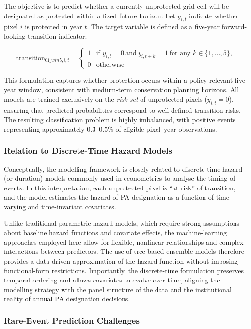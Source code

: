 \documentclass[12pt]{article}
\theoremstyle{break} %
\begin{document}
The objective is to predict whether a currently unprotected grid cell will be designated as protected within a fixed future horizon. Let $y_{i,t}$ indicate whether pixel $i$ is protected in year $t$. The target variable is defined as a five-year forward-looking transition indicator:

\[
\text{transition}_{01\_win5,i,t}
=
\begin{cases}
1 & \text{if } y_{i,t}=0 \ \text{and} \ y_{i,t+k}=1 \ \text{for any } k \in \{1,\dots,5\}, \\
0 & \text{otherwise}.
\end{cases}
\]

This formulation captures whether protection occurs within a policy-relevant
five-year window, consistent with medium-term conservation planning horizons. All models are trained exclusively on the \emph{risk set} of unprotected pixels ($y_{i,t}=0$), ensuring that predicted probabilities correspond to well-defined transition risks. The resulting classification problem is highly imbalanced, with positive events representing approximately $0.3$--$0.5\%$ of eligible pixel--year observations.

\subsubsection{Relation to Discrete-Time Hazard Models}
\label{discrete-time}

Conceptually, the modelling framework is closely related to discrete-time hazard (or duration) models commonly used in econometrics to analyse the timing of events. In this interpretation, each unprotected pixel is ``at risk'' of transition, and the model estimates the hazard of PA designation as a function of time-varying and time-invariant covariates.

Unlike traditional parametric hazard models, which require strong assumptions about baseline hazard functions and covariate effects, the machine-learning approaches employed here allow for flexible, nonlinear relationships and complex interactions between predictors. The use of tree-based ensemble models therefore provides a data-driven approximation of the hazard function without imposing functional-form restrictions. Importantly, the discrete-time formulation preserves temporal ordering and allows covariates to evolve over time, aligning the modelling strategy with the panel structure of the data and the institutional reality of annual PA designation
decisions.

\subsubsection{Rare-Event Prediction Challenges}
\label{challenges}
\end{document}
